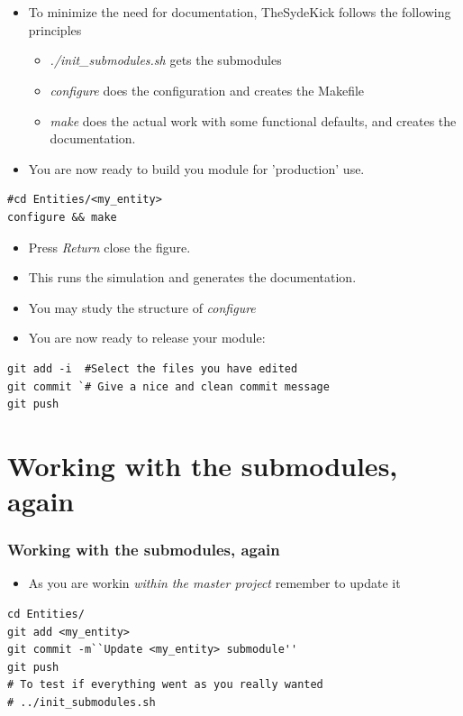 \documentclass{sdkslides}
\begin{document}
\section*{\sectionname}
\begin{frame}[t,fragile]
    \frametitle{\sectionname}
    \begin{itemize}
        \item To minimize the need for documentation, TheSydeKick follows the
            following principles
            \begin{itemize}
                \item \emph{./init\_submodules.sh} gets the submodules
                \item \emph{configure} does the configuration and creates the
                    Makefile
                \item \emph{make} does the actual work with some functional
                    defaults, and creates the documentation.
            \end{itemize}
        \item You are now ready to build you module for 'production' use.
    \end{itemize}
\begin{lstlisting}
#cd Entities/<my_entity>
configure && make
\end{lstlisting}
    \begin{itemize}
        \item Press \emph{Return} close the figure.
        \item This runs the simulation and generates the documentation. 
        \item You may study the structure of \emph{configure}
        \item You are now ready to release your module:
    \end{itemize}
\begin{lstlisting}
git add -i  #Select the files you have edited
git commit `# Give a nice and clean commit message
git push    
\end{lstlisting}
\end{frame}

\renewcommand{\sectionname}{Working with the submodules, again}
\section*{\sectionname}
\begin{frame}[t,fragile]
    \frametitle{\sectionname} 
    \begin{itemize}
        \item As you are workin \emph{within the master project}
                remember to update it
    \end{itemize}
\begin{lstlisting}
cd Entities/
git add <my_entity>
git commit -m``Update <my_entity> submodule''
git push
# To test if everything went as you really wanted
# ../init_submodules.sh
\end{lstlisting}
\end{frame}

\end{document}
